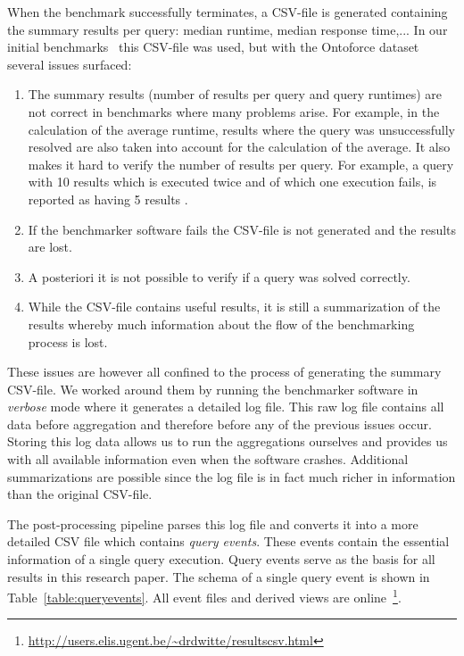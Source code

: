 When the benchmark successfully terminates, a CSV-file is generated containing the summary results per query: median runtime, median response time,...
In our initial benchmarks~\cite{de2016big} this CSV-file was used, but with the Ontoforce dataset several issues surfaced:

\begin{enumerate}
	\item The summary results (number of results per query and query runtimes) are not correct in benchmarks where many problems arise. 
	For example, in the calculation of the average runtime, results where the query was unsuccessfully resolved are also taken into account for the calculation of the average. 
	It also makes it hard to verify the number of results per query. For example, a query with 10 results which is executed twice and of which one execution fails, is reported as having 5 results .
	\item If the benchmarker software fails the CSV-file is not generated and the results are lost.
	\item A posteriori it is not possible to verify if a query was solved correctly.
	\item While the CSV-file contains useful results, it is still a summarization of the results whereby much information about the flow of the benchmarking process is lost. 
\end{enumerate}

These issues are however all confined to the process of generating the summary CSV-file. We worked around them by running 
the benchmarker software in \emph{verbose} mode where it generates a detailed log file. This raw log file contains all data before aggregation and therefore
before any of the previous issues occur. Storing this log data allows us to run the aggregations ourselves and provides us with all available information even when the software crashes. Additional summarizations are possible since the log file is in fact much richer in information than the original CSV-file.

The post-processing pipeline parses this log file and converts it into a more detailed CSV file which contains \emph{query events}. These events contain the essential information of a single query execution. Query events serve as the basis for all results in this research paper. The schema of a single query event is shown in Table~\ref{table:queryevents}. All event files and derived views are online~\footnote{\scriptsize \url{http://users.elis.ugent.be/~drdwitte/resultscsv.html}}.

